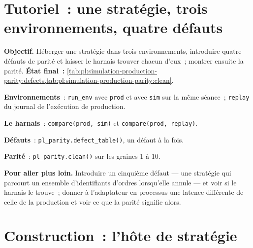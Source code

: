 \section{Tutoriel~: une stratégie, trois environnements, quatre défauts}\label{tut:pl:simulation-production-parity:tut}

\begin{tutorial}
\textbf{Objectif.} Héberger une stratégie dans trois environnements, introduire quatre défauts de parité et laisser le harnais trouver chacun d'eux~; montrer ensuite la parité.
\textbf{État final~:} \cref{tab:pl:simulation-production-parity:defects,tab:pl:simulation-production-parity:clean}.
\begin{tutsteps}
\item \textbf{Environnements}~: \texttt{run\_env} avec \texttt{prod} et avec \texttt{sim} sur la même séance~; \texttt{replay} du
journal de l'exécution de production.
\item \textbf{Le harnais}~: \texttt{compare(prod, sim)} et \texttt{compare(prod, replay)}.
\item \textbf{Défauts}~: \texttt{pl\_parity.defect\_table()}, un défaut à la fois.
\item \textbf{Parité}~: \texttt{pl\_parity.clean()} sur les graines 1 à 10.
\end{tutsteps}
\textbf{Pour aller plus loin.} Introduire un cinquième défaut --- une stratégie qui parcourt un ensemble d'identifiants d'ordres lorsqu'elle annule --- et voir
si le harnais le trouve~; donner à l'adaptateur en processus une latence différente de celle de la production et voir ce que la parité signifie alors.
\end{tutorial}

\section{Construction~: l'hôte de stratégie}\label{bld:pl:simulation-production-parity:strathost}

